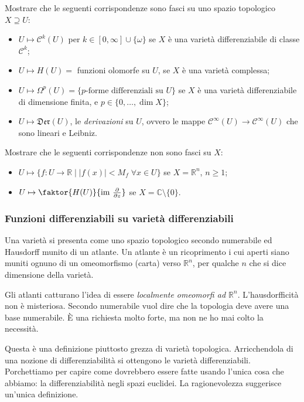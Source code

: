 \begin{MyExercise}
Mostrare che le seguenti corrispondenze sono fasci su uno spazio topologico $X\supseteq U$:
\begin{itemize}
\item $U\mapsto \mathcal C^k(U)$ per $k\in [0,\infty]\cup\{\omega\}$ se $X$ \`e una variet\`a differenziabile di classe $\mathcal C^k$;
\item $U\mapsto H(U) =$ funzioni olomorfe su $U$, se $X$ \`e una variet\`a complessa;
\item $U\mapsto \Omega^p(U) = \{p\text{-forme differenziali su } U\}$ se $X$ \`e una variet\`a differenziabile di dimensione finita, e $p\in\{0,\dots, \dim X\}$;
\item $U\mapsto \mathfrak{Der}(U)$, le \emph{derivazioni} su $U$, ovvero le mappe $\mathcal C^\infty(U)\to \mathcal C^\infty(U)$ che sono lineari e Leibniz.
\end{itemize}
Mostrare che le seguenti corrispondenze non sono fasci su $X$:
\begin{itemize}
\item $U\mapsto \{f\colon U\to\mathbb R\mid |f(x)| < M_f\; \forall x\in U\}$ se $X=\mathbb R^n$, $n\ge 1$;
\item $U\mapsto \faktor{H(U)}{\text{im }\frac{\partial}{\partial z}}$ se $X = \mathbb C\setminus \{0\}$.
\end{itemize}
\end{MyExercise}




\subsubsection*{Funzioni differenziabili su varietà differenziabili}

Una varietà si presenta come uno spazio topologico secondo numerabile ed Hausdorff munito di un atlante.
Un atlante è un ricoprimento i cui aperti siano muniti ognuno di un omeomorfismo (carta) verso $\mathbb R^n$, per qualche $n$ che si dice dimensione della varietà.

Gli atlanti catturano l'idea di essere {\it localmente omeomorfi ad $\mathbb R^n$}.
L'hausdorfficità non è misteriosa.
Secondo numerabile vuol dire che la topologia deve avere una base numerabile.
È una richiesta molto forte, ma non ne ho mai colto la necessità.

Questa è una definizione piuttosto grezza di varietà topologica. Arricchendola di una nozione di differenziabilità si ottengono le varietà differenziabili. Porchettiamo per capire come dovrebbero essere fatte usando l'unica cosa che abbiamo: la differenziabilità negli spazi euclidei. La ragionevolezza suggerisce un'unica definizione.

